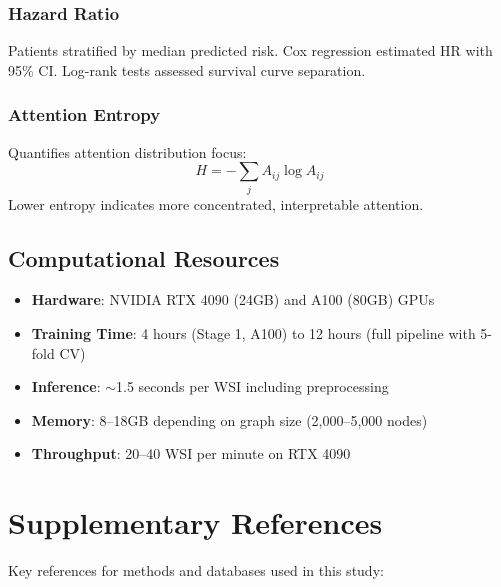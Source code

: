 \documentclass[11pt,a4paper]{article}
\begin{document}
\subsubsection{Hazard Ratio}
Patients stratified by median predicted risk. Cox regression estimated HR with 95\% CI. Log-rank tests assessed survival curve separation.

\subsubsection{Attention Entropy}
Quantifies attention distribution focus:
\begin{equation}
H = -\sum_j A_{ij} \log A_{ij}
\end{equation}
Lower entropy indicates more concentrated, interpretable attention.

\subsection{Computational Resources}

\begin{itemize}
    \item \textbf{Hardware}: NVIDIA RTX 4090 (24GB) and A100 (80GB) GPUs
    \item \textbf{Training Time}: 4 hours (Stage 1, A100) to 12 hours (full pipeline with 5-fold CV)
    \item \textbf{Inference}: $\sim$1.5 seconds per WSI including preprocessing
    \item \textbf{Memory}: 8--18GB depending on graph size (2,000--5,000 nodes)
    \item \textbf{Throughput}: 20--40 WSI per minute on RTX 4090
\end{itemize}

\newpage


\section{Supplementary References}

Key references for methods and databases used in this study:
\end{document}
